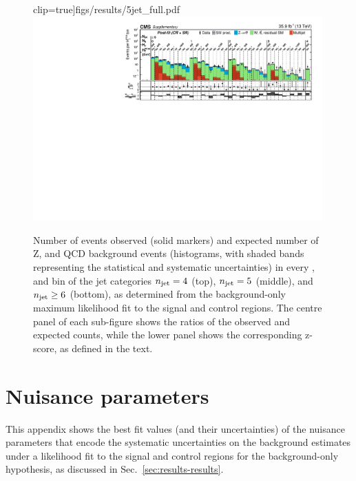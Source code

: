 \begin{figure}[!p]
clip=true]{figs/results/5jet_full.pdf}\\
\includegraphics[width=0.99\textwidth, trim=0 0 0 0, 
clip=true]{figs/results/6jet_full.pdf}\\
\caption{Number of events observed (solid markers) and expected number of Z, 
\ttw and QCD background events (histograms, with shaded bands representing the 
statistical and systematic uncertainties) in every \nb, \scalht and \mht bin of 
the jet categories $n_{\text{jet}} = 4$ (top), $n_{\text{jet}}=5$ (middle), and $n_{\text{jet}}\ge6$ 
(bottom), as determined from the background-only maximum likelihood fit to the 
signal and control regions. 
The centre panel of each sub-figure shows the ratios of the observed and 
expected counts, while the lower panel shows the corresponding z-score, as 
defined in the text.}
\label{fig:results2-fullfit}
\end{figure}

\clearpage
\section{Nuisance parameters}
\label{app:nuisances}
This appendix shows the best fit values (and their uncertainties) of the 
nuisance parameters that encode the systematic uncertainties on the background 
estimates under a likelihood fit to the signal and control regions for the 
background-only hypothesis, as discussed in Sec.~\ref{sec:results-results}.

%	

